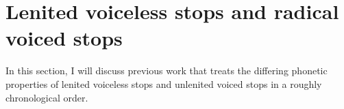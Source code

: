 


\section{Lenited voiceless stops and radical voiced stops}
In this section, I will discuss previous work that treats the differing phonetic properties of lenited voiceless stops and unlenited voiced stops in a roughly chronological order.
